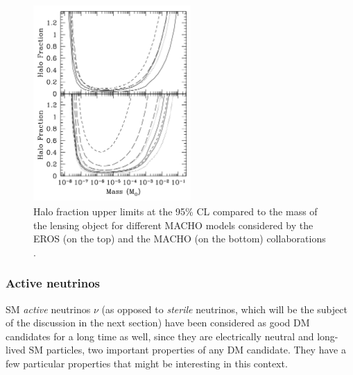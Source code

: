 \documentclass[a4paper, 10pt, openright]{report}
\begin{document}
\begin{figure}[htbp]
\begin{center}
\includegraphics[width=6cm, height=7.5cm]{figs/MACHOExclusion.png}
\caption{Halo fraction upper limits at the 95\% \ac{CL} compared to the mass of the lensing object for different \ac{MACHO} models considered by the EROS (on the top) and the MACHO (on the bottom) collaborations \cite{ExclusionMACHO}.}
\label{figure:ExclusionMACHO}
\end{center}
\end{figure}

\subsubsection*{Active neutrinos}
\ac{SM} \textit{active} neutrinos $\nu$ (as opposed to \textit{sterile} neutrinos, which will be the subject of the discussion in the next section) have been considered as good \ac{DM} candidates for a long time as well, since they are electrically neutral and long-lived \ac{SM} particles, two important properties of any \ac{DM} candidate. They have a few particular properties that might be interesting in this context.
\end{document}
